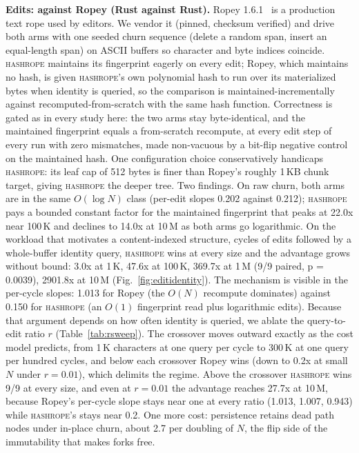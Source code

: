 \documentclass[10pt,conference]{IEEEtran}
\newcommand{\hr}{\textsc{hashrope}}
\begin{document}
\textbf{Edits: against Ropey (Rust against Rust).} Ropey
1.6.1~\cite{ropey} is a production text rope used by editors. We vendor
it (pinned, checksum verified) and drive both arms with one seeded
churn sequence (delete a random span, insert an equal-length span) on
ASCII buffers so character and byte indices coincide. \hr{} maintains
its fingerprint eagerly on every edit; Ropey, which maintains no hash,
is given \hr{}'s own polynomial hash to run over its materialized bytes
when identity is queried, so the comparison is maintained-incrementally
against recomputed-from-scratch with the same hash function.
Correctness is gated as in every study here: the two arms stay
byte-identical, and the maintained fingerprint equals a from-scratch
recompute, at every edit step of every run with zero mismatches, made
non-vacuous by a bit-flip negative control on the maintained hash.
One configuration choice conservatively handicaps \hr{}: its leaf cap
of 512 bytes is finer than Ropey's roughly 1\,KB chunk target, giving
\hr{} the deeper tree. Two findings. On raw churn, both arms are in the same $O(\log N)$ class
(per-edit slopes 0.202 against 0.212); \hr{} pays a bounded constant
factor for the maintained fingerprint that peaks at 22.0x near 100\,K
and declines to 14.0x at 10\,M as both arms go logarithmic. On the
workload that motivates a content-indexed structure, cycles of edits
followed by a whole-buffer identity query, \hr{} wins at every size and
the advantage grows without bound: 3.0x at 1\,K, 47.6x at 100\,K,
369.7x at 1\,M (9/9 paired, p = 0.0039), 2901.8x at 10\,M
(Fig.~\ref{fig:editidentity}). The mechanism is visible in the
per-cycle slopes: 1.013 for Ropey (the $O(N)$ recompute dominates)
against 0.150 for \hr{} (an $O(1)$ fingerprint read plus logarithmic
edits). Because that argument depends on how often identity is
queried, we ablate the query-to-edit ratio $r$
(Table~\ref{tab:rsweep}). The crossover moves outward exactly as the
cost model predicts, from 1\,K characters at one query per cycle to
300\,K at one query per hundred cycles, and below each crossover Ropey
wins (down to 0.2x at small $N$ under $r = 0.01$), which delimits the
regime. Above the crossover \hr{} wins 9/9 at every
size, and even at $r = 0.01$ the advantage reaches 27.7x at 10\,M,
because Ropey's per-cycle slope stays near one at every ratio (1.013,
1.007, 0.943) while \hr{}'s stays near 0.2. One more cost: persistence
retains dead path nodes under in-place churn, about 2.7 per doubling
of $N$, the flip side of the immutability that makes forks free.
\end{document}
